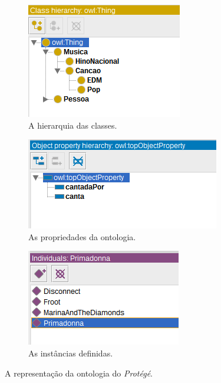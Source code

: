 \begin{figure}[H]
	\centering
	\begin{subfigure}{.3\textwidth}
		\centering
		\includegraphics[width=0.95\linewidth]{Capitulos/Ferramentas/classes}
		\caption{A hierarquia das classes.}
	\end{subfigure}%
	\begin{subfigure}{.475\textwidth}
		\centering
		\includegraphics[width=0.95\linewidth]{Capitulos/Ferramentas/propriedades}
		\caption{As propriedades da ontologia.}
	\end{subfigure}
	\begin{subfigure}{.3\textwidth}
		\centering
		\includegraphics[width=0.95\linewidth]{Capitulos/Ferramentas/individuos}
		\caption{As instâncias definidas.}
	\end{subfigure}
	\caption{A representação da ontologia do \textit{Protégé}.}
	\label{img:Representacao}
\end{figure}
 
